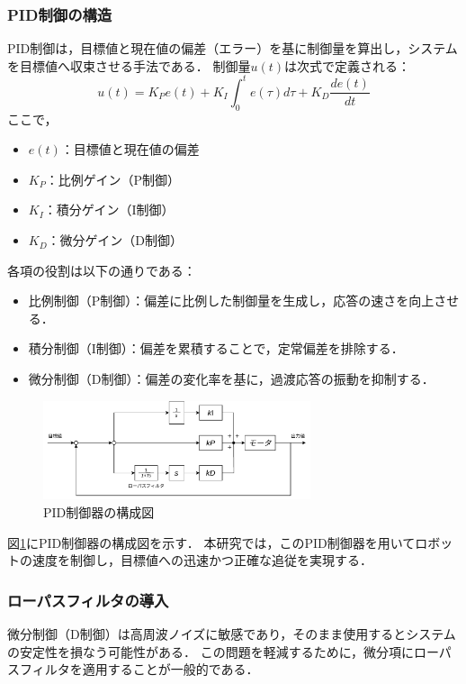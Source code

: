 \subsubsection{PID制御の構造}
PID制御は，目標値と現在値の偏差（エラー）を基に制御量を算出し，システムを目標値へ収束させる手法である．
制御量$u(t)$は次式で定義される：
\begin{equation}
    u(t) = K_P e(t) + K_I \int_{0}^{t} e(\tau) d\tau + K_D \frac{de(t)}{dt}
    \label{eq:pid}
\end{equation}
ここで，
\begin{itemize}
    \item $e(t)$：目標値と現在値の偏差
    \item $K_P$：比例ゲイン（P制御）
    \item $K_I$：積分ゲイン（I制御）
    \item $K_D$：微分ゲイン（D制御）
\end{itemize}
各項の役割は以下の通りである：
\begin{itemize}
    \item 比例制御（P制御）：偏差に比例した制御量を生成し，応答の速さを向上させる．
    \item 積分制御（I制御）：偏差を累積することで，定常偏差を排除する．
    \item 微分制御（D制御）：偏差の変化率を基に，過渡応答の振動を抑制する．
\end{itemize}

\begin{figure}[h]
    \centering
    \includegraphics[width=0.7\textwidth]{figure/pid.pdf}
    \caption{PID制御器の構成図}
    \label{fig:pid_controller}
\end{figure}

図\ref{fig:pid_controller}にPID制御器の構成図を示す．
本研究では，このPID制御器を用いてロボットの速度を制御し，目標値への迅速かつ正確な追従を実現する．

\subsubsection{ローパスフィルタの導入}
微分制御（D制御）は高周波ノイズに敏感であり，そのまま使用するとシステムの安定性を損なう可能性がある．
この問題を軽減するために，微分項にローパスフィルタを適用することが一般的である．

